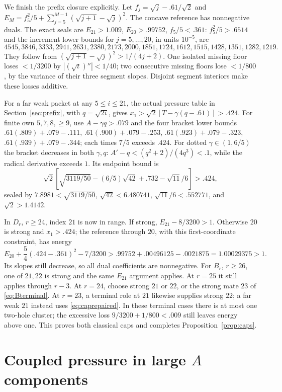 \documentclass[11pt]{article}
\theoremstyle{remark}
\begin{document}
We finish the prefix closure explicitly. Let
$f_j=\sqrt j-.61/\sqrt2$ and
$E_M=f_5^2/5+\sum_{j=5}^{M-1}(\sqrt{j+1}-\sqrt j)^2$.
The concave reference has nonnegative duals. The exact seals are
$E_{21}>1.009$, $E_{20}>.99752$, $f_5/5<.361$:
$f_5^2/5>.6514$ and the increment lower bounds for $j=5,\ldots,20$,
in units $10^{-5}$, are
\[
4545,3846,3333,2941,2631,2380,2173,2000,
1851,1724,1612,1515,1428,1351,1282,1219.
\]
They follow from $(\sqrt{j+1}-\sqrt j)^2>1/(4j+2)$.
One isolated missing floor loses $<1/3200$ by
$|(\sqrt t)''|<1/40$; two consecutive missing floors lose
$<1/800$, by the variance of their three segment slopes.
Disjoint segment interiors make these losses additive.

For a far weak packet at any $5\le i\le21$, the actual pressure
table in Section~\ref{sec:prefix}, with $q=\sqrt{2i}$, gives
$x_1>\sqrt2[T-\gamma(q-.61)]>.424$.
For finite own $5,7,8,\ge9$, use $A-\gamma q>.079$ and the
four bracket lower bounds
$ .61(.809)+.079-.111$,
$ .61(.900)+.079-.253$,
$ .61(.923)+.079-.323$,
$ .61(.939)+.079-.344$; each times $7/5$ exceeds $.424$.
For dotted $\gamma\in(1,6/5)$ the bracket decreases in both
$\gamma,q$: $A'-q<(q^2+2)/(4q^3)<.1$, while the radical
derivative exceeds $1$. Its endpoint bound is
\[
 \sqrt2[\sqrt{3119/50}-(6/5)\sqrt{42}+.732-\sqrt{11}/6]>.424,
\]
sealed by $7.8981<\sqrt{3119/50}$, $\sqrt{42}<6.480741$,
$\sqrt{11}/6<.552771$, and $\sqrt2>1.4142$.

In $D_r$, $r\ge24$, index $21$ is now in range. If strong,
$E_{21}-8/3200>1$. Otherwise $20$ is strong and $x_1>.424$;
the reference through $20$, with this first-coordinate constraint,
has energy
\begin{equation}\label{eq:caprepaired}
 E_{20}+\frac54(.424-.361)^2-7/3200
 >.99752+.00496125-.0021875=1.00029375>1.
\end{equation}
Its slopes still decrease, so all dual coefficients are nonnegative.
For $B_r$, $r\ge26$, one of $21,22$ is strong and the same
$E_{21}$ argument applies. At $r=25$ it still applies through
$r-3$. At $r=24$, choose strong $21$ or $22$, or the strong mate
$23$ of \eqref{eq:Bterminal}. At $r=23$, a terminal role at $21$
likewise supplies strong $22$; a far weak $21$ instead uses
\eqref{eq:caprepaired}. In these terminal cases there is at most
one two-hole cluster; the excessive loss $9/3200+1/800<.009$
still leaves energy above one. This proves both classical caps and
completes Proposition~\ref{prop:caps}.

\section{Coupled pressure in large \texorpdfstring{\(A\)}{A} components}\label{sec:largeA}
\end{document}

